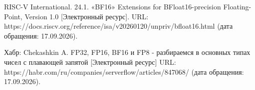 \newpage
{} \par

\begin{thebibliography}{}
     RISC-V International. 24.1. «BF16» Extensions for BFloat16-precision Floating-Point, Version 1.0 [Электронный ресурс]. URL: https://docs.riscv.org/reference/isa/v20260120/unpriv/bfloat16.html (дата обращения: 17.09.2026).

     Хабр: Chekashkin A. FP32, FP16, BF16 и FP8 - разбираемся в основных типах чисел с плавающей запятой [Электронный ресурс] URL: https://habr.com/ru/companies/serverflow/articles/847068/ (дата обращения: 17.09.2026).
\end{thebibliography}

